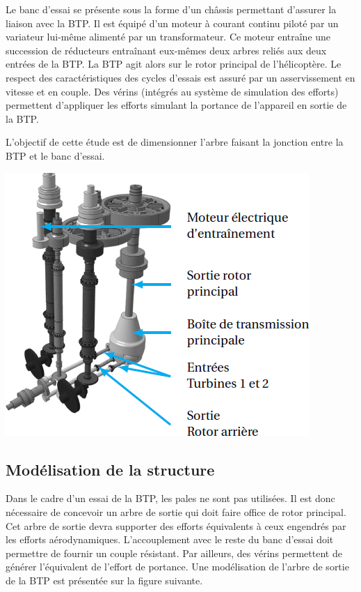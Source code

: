 \documentclass[10pt,fleqn]{article} %
\begin{document}
\begin{multicols}{2}
Le banc d’essai se présente sous la forme d’un châssis permettant d’assurer la liaison avec la BTP. Il est équipé d’un moteur à courant continu piloté par un variateur lui-même alimenté par un transformateur. Ce moteur
entraîne une succession de réducteurs entraînant eux-mêmes deux arbres reliés aux deux
entrées de la BTP. La BTP agit alors sur le rotor principal de l’hélicoptère. Le respect des
caractéristiques des cycles d’essais est assuré par un asservissement en vitesse et en couple.
Des vérins (intégrés au système de simulation des efforts) permettent d’appliquer les efforts simulant la portance de l’appareil en sortie de la BTP.

\begin{obj}
L’objectif de cette étude est de dimensionner l’arbre faisant la jonction entre la
BTP et le banc d’essai.
\end{obj}

\begin{center}
\includegraphics[width=.8\linewidth]{images/fig_03}
\end{center}

\normalsize 




\subsection*{Modélisation de la structure}

Dans le cadre d’un essai de la BTP, les pales ne sont pas utilisées. Il est donc nécessaire
de concevoir un arbre de sortie qui doit faire office de rotor principal. Cet arbre de sortie
devra supporter des efforts équivalents à ceux engendrés par les efforts aérodynamiques.
L’accouplement avec le reste du banc d’essai doit permettre de fournir un couple
résistant. Par ailleurs, des vérins permettent de générer l’équivalent de
l’effort de portance. Une modélisation de l’arbre de sortie de la BTP est présentée sur la
figure  suivante.


\end{multicols}
\end{document}
